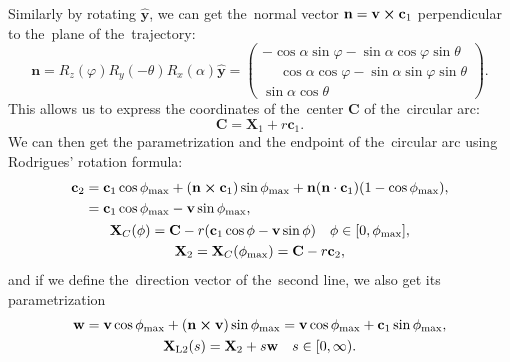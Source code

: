 			 Similarly by rotating $\mathbf{\hat{y}}$, we can get the~normal vector $\mathbf{n}=\mathbf{v}\cross\mathbf{c}_1$ perpendicular to the~plane of the~trajectory:
				\begin{equation}
					\mathbf{n} = R_z(\varphi)R_y(-\theta)R_x(\alpha)\mathbf{\hat{y}}=
									\begin{pmatrix}
										-\cos\alpha\sin\varphi-\sin\alpha\cos\varphi\sin\theta\\
										\phantom{-}\cos\alpha\cos\varphi-\sin\alpha\sin\varphi\sin\theta\\
										\sin\alpha\cos\theta
									\end{pmatrix}.
				\end{equation}
			This allows us to express the coordinates of the~center $\mathbf{C}$ of the~circular arc:
				\begin{equation}
					\mathbf{C} = \mathbf{X}_1+r\mathbf{c}_1.
				\end{equation}
			We can then get the parametrization and the endpoint of the~circular arc using Rodrigues' rotation formula:
				\begin{gather}
					\begin{aligned}
						\mathbf{c}_2 &= \mathbf{c}_1\cos\phi_\text{max} + (\mathbf{n}\cross\mathbf{c}_1)\sin\phi_\text{max} + \mathbf{n}(\mathbf{n}\cdot\mathbf{c}_1)(1-\cos\phi_\text{max}),\\
						&= \mathbf{c}_1\cos\phi_\text{max} - \mathbf{v}\sin\phi_\text{max},
					\end{aligned}\\
					\mathbf{X}_C(\phi) = \mathbf{C} - r(\mathbf{c}_1\cos\phi - \mathbf{v}\sin\phi) \quad \phi\in[0,\phi_\text{max}],\\
					\mathbf{X}_2 = \mathbf{X}_C(\phi_\text{max}) = \mathbf{C} - r\mathbf{c}_2,
				\end{gather}
			and if we define the~direction vector of the~second line, we also get its parametrization
				\begin{gather}
					\mathbf{w} = \mathbf{v}\cos\phi_\text{max} + (\mathbf{n}\cross\mathbf{v})\sin\phi_\text{max} = \mathbf{v}\cos\phi_\text{max} + \mathbf{c}_1\sin\phi_\text{max},\\
					\mathbf{X}_\text{L2}(s) = \mathbf{X}_2 + s\mathbf{w} \quad s\in[0,\infty).
				\end{gather}
				
